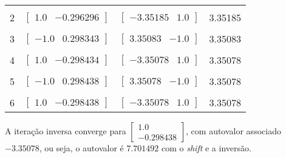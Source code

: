 \documentclass[a4paper,11pt]{article}
\begin{document}
\begin{enumerate}[label=\textbf{(\alph*)}]
\begin{center}
\begin{tabular}{ | c | c | c | c | }
                    \hline
                    & & & \\ [-1em]
                    2  & $\begin{bmatrix} 1.0 & -0.296296 \end{bmatrix}$ & $\begin{bmatrix} -3.35185 & 1.0 \end{bmatrix}$  & 3.35185 \\ [+.5em]
                    \hline
                    & & & \\ [-1em]
                    3  & $\begin{bmatrix} -1.0 & 0.298343 \end{bmatrix}$ & $\begin{bmatrix} 3.35083 & -1.0 \end{bmatrix}$  & 3.35083 \\ [+.5em]
                    \hline
                    & & & \\ [-1em]
                    4  & $\begin{bmatrix} 1.0 & -0.298434 \end{bmatrix}$ & $\begin{bmatrix} -3.35078 & 1.0 \end{bmatrix}$  & 3.35078 \\ [+.5em]
                    \hline
                    & & & \\ [-1em]
                    5  & $\begin{bmatrix} -1.0 & 0.298438 \end{bmatrix}$ & $\begin{bmatrix} 3.35078 & -1.0 \end{bmatrix}$  & 3.35078 \\ [+.5em]
                    \hline
                    & & & \\ [-1em]
                    6  & $\begin{bmatrix} 1.0 & -0.298438 \end{bmatrix}$ & $\begin{bmatrix} -3.35078 & 1.0 \end{bmatrix}$  & 3.35078 \\ [+.5em]
                    \hline
                \end{tabular}
            \end{center}
            A iteração inversa converge para $\begin{bmatrix} 1.0 \\ -0.298438\end{bmatrix}$, com autovalor associado $-3.35078$, ou seja, o autovalor é $7.701492$ com o \textit{shift} e a inversão.
            

\end{enumerate}
\end{document}
